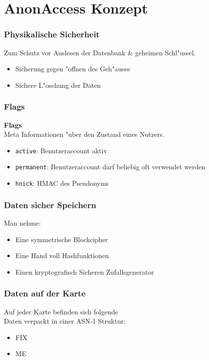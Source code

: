 \section{AnonAccess Konzept}

\begin{frame}
	\frametitle{Physikalische Sicherheit}
	Zum Schutz vor Auslesen der Datenbank \& geheimen Schl"ussel.
	\begin{itemize}
		\item<2-> Sicherung gegen "offnen des Geh"auses
		\item<3-> Sichere L"oschung der Daten
	\end{itemize}
\end{frame}

%
%

\begin{frame}
	\frametitle{Flags}
	\vspace{1cm}

	\textbf{Flags}
	\\
	Meta Informationen "uber den Zustand eines Nutzers.
	\begin{itemize}
		\item \texttt{active}: Benutzeraccount aktiv
		\item \texttt{permanent}: Benutzeraccount darf beliebig oft verwendet werden
		\item \texttt{hnick}: HMAC des Pseudonyms
	\end{itemize}
\end{frame}
\begin{frame}
	\frametitle{Daten sicher Speichern}
	Man nehme:
	\begin{itemize}
		\item<2-> Eine symmetrische Blockcipher
		\item<3-> Eine Hand voll Hashfunktionen
		\item<4-> Einen kryptografisch Sicheren Zufallsgenerator
	\end{itemize}
\end{frame}

\begin{frame}
	\frametitle{Daten auf der Karte}
	Auf jeder Karte befinden sich folgende\\
	Daten verpackt in einer ASN-1 Struktur:
	\begin{itemize}
		\item<2-> FIX
		\item<3-> ME
	\end{itemize}
\end{frame}
